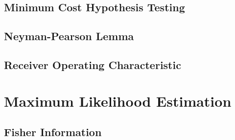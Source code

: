 \documentclass[11pt]{report} %
\begin{document}
\subsection{Minimum Cost Hypothesis Testing}

\subsection{Neyman-Pearson Lemma}

\subsection{Receiver Operating Characteristic}

\section{Maximum Likelihood Estimation}

\subsection{Fisher Information}
\end{document}
